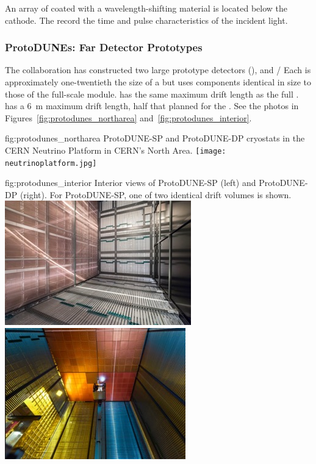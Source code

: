 An array of  coated with a wavelength-shifting material is located below the cathode. The  record  the time and pulse characteristics of the incident light.



\FloatBarrier

\subsubsection{ProtoDUNEs: Far Detector Prototypes}

The  collaboration has constructed 
two large prototype detectors (),  and / %
 Each is approximately one-twentieth the size of a   but uses components identical in size to those of the full-scale module.  has the same \spmaxdrift maximum drift length as the full .  has a \SI{6}{m} maximum drift length, half that planned for the . See the photos in Figures~\ref{fig:protodunes_northarea} and~\ref{fig:protodunes_interior}.

\begin{dunefigure}
{fig:protodunes_northarea}
{ProtoDUNE-SP and ProtoDUNE-DP cryostats in the CERN Neutrino Platform in CERN's North Area.}
\texttt{[image: neutrinoplatform.jpg]}
\end{dunefigure}

\begin{dunefigure}
{fig:protodunes_interior}
{Interior views of ProtoDUNE-SP (left) and ProtoDUNE-DP (right). For ProtoDUNE-SP, one of two identical drift volumes is shown.}
\includegraphics[width=0.46\linewidth]{graphics/ProtoDUNE-sp-interior.jpg}\hspace{0.05\linewidth}
\includegraphics[width=0.44\linewidth]{graphics/protodune-dp-interior.jpg}
\end{dunefigure}

